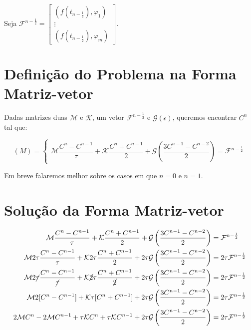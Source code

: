   Seja $\displaystyle \mathcal{F}^{n-\frac{1}{2}} = \begin{bmatrix} (f(t_{n - \frac{1}{2}}), \varphi_1) \\ \vdots \\ (f(t_{n - \frac{1}{2}}), \varphi_m) \end{bmatrix}$.

\section{Definição do Problema na Forma Matriz-vetor}

  Dadas matrizes duas $\mathcal{M}$ e $\mathcal{K}$, um vetor $\mathcal{F}^{n-\frac{1}{2}}$ e $\mathcal{G(c)}$, queremos encontrar $C^n$ tal que:

  \[(M) = \begin{cases} \mathcal{M} \displaystyle\dfrac{C^n - C^{n-1}}{\tau} + \mathcal{K} \displaystyle\dfrac{C^n + C^{n-1}}{2} + \mathcal{G}\left(\dfrac{3C^{n-1} - C^{n-2}}{2}\right) = \mathcal{F}^{n - \frac{1}{2}}\end{cases}\]

  Em breve falaremos melhor sobre os casos em que $n=0$ e $n=1$.

  \section{Solução da Forma Matriz-vetor}

  \begin{align*}
    \mathcal{M} \dfrac{C^n - C^{n-1}}{\tau} + \mathcal{K} \dfrac{C^n + C^{n-1}}{2} + \mathcal{G}\left(\dfrac{3C^{n-1} - C^{n-2}}{2}\right) &= \mathcal{F}^{n - \frac{1}{2}}\\
    \mathcal{M} 2\tau \dfrac{C^n - C^{n-1}}{\tau} + \mathcal{K} 2\tau \dfrac{C^n + C^{n-1}}{2} + 2\tau\mathcal{G}\left(\dfrac{3C^{n-1} - C^{n-2}}{2}\right) &= 2\tau \mathcal{F}^{n - \frac{1}{2}}\\
    \mathcal{M} 2\cancel{\tau} \dfrac{C^n - C^{n-1}}{\cancel{\tau}} + \mathcal{K} \cancel{2}\tau \dfrac{C^n + C^{n-1}}{\cancel{2}} + 2\tau\mathcal{G}\left(\dfrac{3C^{n-1} - C^{n-2}}{2}\right) &= 2\tau \mathcal{F}^{n - \frac{1}{2}}\\
    \mathcal{M} 2 [C^n - C^{n-1}] + \mathcal{K} \tau [C^n + C^{n-1}] + 2\tau\mathcal{G}\left(\dfrac{3C^{n-1} - C^{n-2}}{2}\right) &= 2\tau \mathcal{F}^{n - \frac{1}{2}}\\
    2\mathcal{M}C^n - 2\mathcal{M}C^{n-1} + \tau\mathcal{K}C^n + \tau\mathcal{K}C^{n-1} + 2\tau\mathcal{G}\left(\dfrac{3C^{n-1} - C^{n-2}}{2}\right) &= 2\tau \mathcal{F}^{n - \frac{1}{2}}
  \end{align*}


